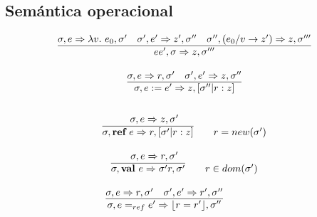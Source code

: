   \pagebreak
  \subsection{Semántica operacional} 
    \begin{multicols}{2}  
      \[\begin{array}{c}
        \underline{\sigma,e \Rightarrow \lambda v.\ e_0,\sigma'\quad \sigma',e' \Rightarrow z',\sigma''\quad \sigma'', (e_0/v\rightarrow z') \Rightarrow z,\sigma'''}\\
        ee',\sigma \Rightarrow z,\sigma''' \\ \\

        \underline{\sigma,e \Rightarrow r,\sigma'\quad \sigma',e' \Rightarrow z,\sigma''} \\
        \sigma,e:=e' \Rightarrow z,[\sigma''|r:z] \\ \\
      \end{array}\]
      \[\begin{array}{c}
        \sigma,e \Rightarrow z,\sigma' \qquad \qquad \qquad \\
        \overline{\sigma,\textbf{ref}\ e \Rightarrow r,[\sigma'|r:z]} \qquad r = new(\sigma') \\ \\

        \sigma,e \Rightarrow r,\sigma' \qquad \qquad \qquad \\
        \overline{\sigma,\textbf{val}\ e \Rightarrow \sigma' r,\sigma'} \qquad r \in dom(\sigma') \\ \\

        \underline{\sigma,e \Rightarrow r,\sigma'\quad \sigma',e' \Rightarrow r',\sigma''} \qquad \qquad \\
        \sigma,e=_{ref}e' \Rightarrow \lfloor r=r'\rfloor,\sigma'' \qquad \qquad 
      \end{array}\]
    \end{multicols}

